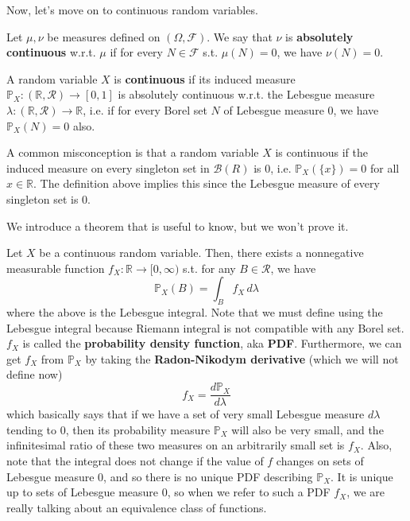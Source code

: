     Now, let's move on to continuous random variables. 

    \begin{definition}
      Let $\mu, \nu$ be measures defined on $(\Omega, \mathcal{F})$. We say that $\nu$ is \textbf{absolutely continuous} w.r.t. $\mu$ if for every $N \in \mathcal{F}$ s.t. $\mu(N) = 0$, we have $\nu(N) = 0$. 
    \end{definition}

    \begin{definition}
      A random variable $X$ is \textbf{continuous} if its induced measure $\mathbb{P}_X: (\mathbb{R}, \mathcal{R}) \rightarrow [0, 1]$ is absolutely continuous w.r.t. the Lebesgue measure $\lambda: (\mathbb{R}, \mathcal{R}) \rightarrow \mathbb{R}$, i.e. if for every Borel set $N$ of Lebesgue measure $0$, we have $\mathbb{P}_X (N) = 0$ also. 
    \end{definition}

    A common misconception is that a random variable $X$ is continuous if the induced measure on every singleton set in $\mathcal{B}(R)$ is $0$, i.e. $\mathbb{P}_X (\{x\}) = 0$ for all $x \in \mathbb{R}$. The definition above implies this since the Lebesgue measure of every singleton set is $0$. 

    We introduce a theorem that is useful to know, but we won't prove it. 

    \begin{theorem}
      Let $X$ be a continuous random variable. Then, there exists a nonnegative measurable function $f_X : \mathbb{R} \longrightarrow [0, \infty)$ s.t. for any $B \in \mathcal{R}$, we have 
      \begin{equation}
        \mathbb{P}_X (B) = \int_B f_X \, d\lambda
      \end{equation}
      where the above is the Lebesgue integral. Note that we must define using the Lebesgue integral because Riemann integral is not compatible with any Borel set. $f_X$ is called the \textbf{probability density function}, aka \textbf{PDF}. Furthermore, we can get $f_X$ from $\mathbb{P}_X$ by taking the \textbf{Radon-Nikodym derivative} (which we will not define now)
      \begin{equation}
        f_X = \frac{d \mathbb{P}_X}{d \lambda}
      \end{equation}
      which basically says that if we have a set of very small Lebesgue measure $d \lambda$ tending to $0$, then its probability measure $\mathbb{P}_X$ will also be very small, and the infinitesimal ratio of these two measures on an arbitrarily small set is $f_X$. Also, note that the integral does not change if the value of $f$ changes on sets of Lebesgue measure $0$, and so there is no unique PDF describing $\mathbb{P}_X$. It is unique up to sets of Lebesgue measure $0$, so when we refer to such a PDF $f_X$, we are really talking about an equivalence class of functions. 
    \end{theorem}

